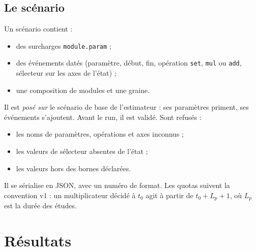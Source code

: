 \documentclass[11pt]{article}
\begin{document}
\subsection{Le scénario}
Un scénario contient :
\begin{itemize}
  \item des surcharges \texttt{module.param} ;
  \item des événements datés (paramètre, début, fin, opération \texttt{set}, \texttt{mul} ou
        \texttt{add}, sélecteur sur les axes de l'état) ;
  \item une composition de modules et une graine.
\end{itemize}
Il est \emph{posé sur} le scénario de base de l'estimateur : ses paramètres priment, ses événements
s'ajoutent. Avant le run, il est validé. Sont refusés :
\begin{itemize}
  \item les noms de paramètres, opérations et axes inconnus ;
  \item les valeurs de sélecteur absentes de l'état ;
  \item les valeurs hors des bornes déclarées.
\end{itemize}
Il se sérialise en JSON, avec un numéro de format. Les quotas suivent la convention v1 : un
multiplicateur décidé à $t_0$ agit à partir de $t_0 + L_p + 1$, où $L_p$ est la durée des études.

\section{Résultats}\label{sec:resultats}
\end{document}
